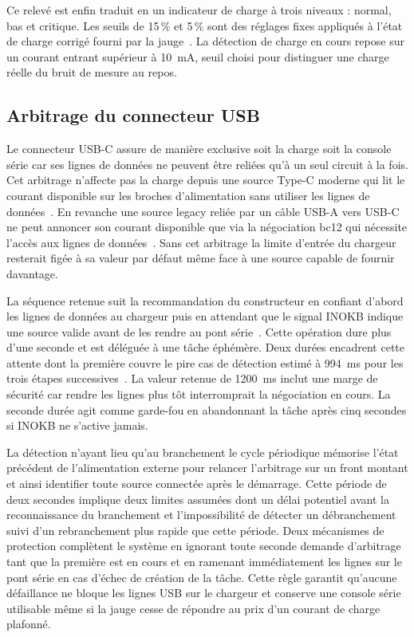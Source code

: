 Ce relevé est enfin traduit en un indicateur de charge à trois niveaux : normal, bas et critique. Les seuils de 15\,\% et 5\,\% sont des réglages fixes appliqués à l'état de charge corrigé fourni par la jauge~\cite{analog_MAX17260}. La détection de charge en cours repose sur un courant entrant supérieur à 10~mA, seuil choisi pour distinguer une charge réelle du bruit de mesure au repos.

\subsection{Arbitrage du connecteur USB}

Le connecteur USB-C assure de manière exclusive soit la charge soit la console série car ses lignes de données ne peuvent être reliées qu'à un seul circuit à la fois. Cet arbitrage n'affecte pas la charge depuis une source Type-C moderne qui lit le courant disponible sur les broches d'alimentation sans utiliser les lignes de données~\cite{analog_MAX77757}. En revanche une source legacy reliée par un câble USB-A vers USB-C ne peut annoncer son courant disponible que via la négociation \gls{bc12} qui nécessite l'accès aux lignes de données~\cite{usb_bc12}. Sans cet arbitrage la limite d'entrée du chargeur resterait figée à sa valeur par défaut même face à une source capable de fournir davantage.

La séquence retenue suit la recommandation du constructeur en confiant d'abord les lignes de données au chargeur puis en attendant que le signal INOKB indique une source valide avant de les rendre au pont série~\cite{analog_MAX77757}. Cette opération dure plus d'une seconde et est déléguée à une tâche éphémère. Deux durées encadrent cette attente dont la première couvre le pire cas de détection estimé à 994~ms pour les trois étapes successives~\cite{analog_MAX77757}. La valeur retenue de 1200~ms inclut une marge de sécurité car rendre les lignes plus tôt interromprait la négociation en cours. La seconde durée agit comme garde-fou en abandonnant la tâche après cinq secondes si INOKB ne s'active jamais.

La détection n'ayant lieu qu'au branchement le cycle périodique mémorise l'état précédent de l'alimentation externe pour relancer l'arbitrage sur un front montant et ainsi identifier toute source connectée après le démarrage. Cette période de deux secondes implique deux limites assumées dont un délai potentiel avant la reconnaissance du branchement et l'impossibilité de détecter un débranchement suivi d'un rebranchement plus rapide que cette période. Deux mécanismes de protection complètent le système en ignorant toute seconde demande d'arbitrage tant que la première est en cours et en ramenant immédiatement les lignes sur le pont série en cas d'échec de création de la tâche. Cette règle garantit qu'aucune défaillance ne bloque les lignes USB sur le chargeur et conserve une console série utilisable même si la jauge cesse de répondre au prix d'un courant de charge plafonné.


